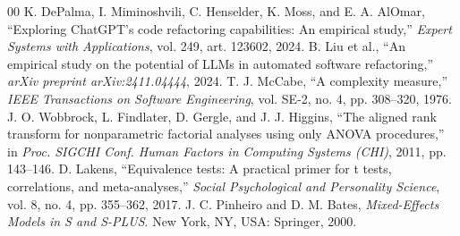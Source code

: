 \documentclass[10pt,conference,a4paper,twocolumn]{article}
\begin{document}
\begin{thebibliography}{00}
 K. DePalma, I. Miminoshvili, C. Henselder, K. Moss, and E. A. AlOmar, ``Exploring ChatGPT's code refactoring capabilities: An empirical study,'' \textit{Expert Systems with Applications}, vol. 249, art. 123602, 2024.
 B. Liu et al., ``An empirical study on the potential of LLMs in automated software refactoring,'' \textit{arXiv preprint arXiv:2411.04444}, 2024.
 T. J. McCabe, ``A complexity measure,'' \textit{IEEE Transactions on Software Engineering}, vol. SE-2, no. 4, pp. 308--320, 1976.
 J. O. Wobbrock, L. Findlater, D. Gergle, and J. J. Higgins, ``The aligned rank transform for nonparametric factorial analyses using only ANOVA procedures,'' in \textit{Proc. SIGCHI Conf. Human Factors in Computing Systems (CHI)}, 2011, pp. 143--146.
 D. Lakens, ``Equivalence tests: A practical primer for t tests, correlations, and meta-analyses,'' \textit{Social Psychological and Personality Science}, vol. 8, no. 4, pp. 355--362, 2017.
 J. C. Pinheiro and D. M. Bates, \textit{Mixed-Effects Models in S and S-PLUS}. New York, NY, USA: Springer, 2000.
\end{thebibliography}
\end{document}
